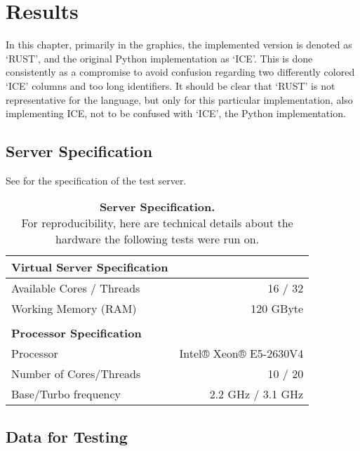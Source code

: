 \chapter{Results}\label{chap:results}

In this chapter, primarily in the graphics, the implemented version is denoted
as `RUST', and the original Python implementation as `ICE'. This is done
consistently as a compromise to avoid confusion regarding two differently
colored `ICE' columns and too long identifiers. It should be clear that `RUST'
is not representative for the language, but only for this particular
implementation, also implementing ICE, not to be confused with `ICE', the
Python implementation.

\section{Server Specification}\label{sec:specs}

See  for the specification of the test server.

\begin{table}[ht]
    \begin{tabular}{@{}lr@{}}
        \textbf{Virtual Server Specification} & \\
        \midrule
        Available Cores / Threads & 16 / 32 \\
        Working Memory (RAM) & 120 GByte \\ \\
        \textbf{Processor Specification} & \\
        \midrule
        Processor & Intel® Xeon® E5-2630V4\footnotemark \\
        Number of Cores/Threads & 10 / 20 \\
        Base/Turbo frequency & 2.2 GHz / 3.1 GHz \\
    \end{tabular}
    \caption[Server Specification]
    {\textbf{Server Specification.} \\
    For reproducibility, here are technical details about the hardware the
    following tests were run on.}
    \label{tab:specs}
\end{table}



\newpage
\section{Data for Testing}\label{sec:data}

